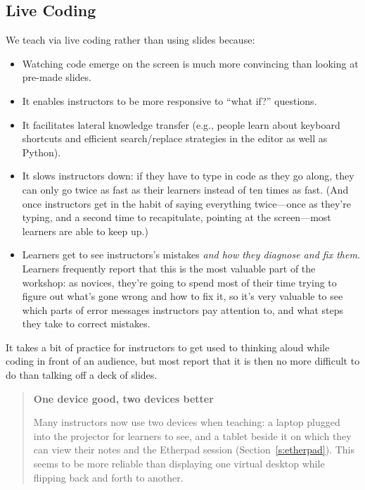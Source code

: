 \documentclass[10pt,a4paper,twocolumn]{article}
\begin{document}
\subsection{Live Coding}

We teach via live coding rather than using slides because:

\begin{itemize}

\item Watching code emerge on the screen is much more convincing than
  looking at pre-made slides.

\item It enables instructors to be more responsive to ``what if?''
  questions.

\item It facilitates lateral knowledge transfer (e.g., people learn
  about keyboard shortcuts and efficient search/replace strategies in
  the editor as well as Python).

\item It slows instructors down: if they have to type in code as they
  go along, they can only go twice as fast as their learners instead
  of ten times as fast.  (And once instructors get in the habit of
  saying everything twice---once as they're typing, and a second time
  to recapitulate, pointing at the screen---most learners are able to
  keep up.)

\item Learners get to see instructors's mistakes \emph{and how they
  diagnose and fix them}.  Learners frequently report that this is the
  most valuable part of the workshop: as novices, they're going to
  spend most of their time trying to figure out what's gone wrong and
  how to fix it, so it's very valuable to see which parts of error
  messages instructors pay attention to, and what steps they take to
  correct mistakes.

\end{itemize}

It takes a bit of practice for instructors to
get used to thinking aloud while coding in front of an audience, but
most report that it is then no more difficult to do than talking off a
deck of slides.

\begin{quote}
\textbf{One device good, two devices better}

Many instructors now use two devices when teaching: a laptop plugged
into the projector for learners to see, and a tablet beside it on
which they can view their notes and the Etherpad session
(Section~\ref{s:etherpad}).  This seems to be more reliable than
displaying one virtual desktop while flipping back and forth to
another.
\end{quote}
\end{document}
